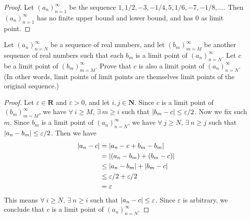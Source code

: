 \begin{proof}
Let \((a_n)_{n = 1}^\infty\) be the sequence \(1, 1/2, -3, -1/4, 5, 1/6, -7, -1/8, \dots\).
Then \((a_n)_{n = 1}^\infty\) has no finite upper bound and lower bound, and has \(0\) as limit point.
\end{proof}

\begin{exercise}\label{ex 6.4.10}
Let \((a_n)_{n = N}^\infty\) be a sequence of real numbers, and let \((b_m)_{m = M}^\infty\) be another sequence of real numbers such that each \(b_m\) is a limit point of \((a_n)_{n = N}^\infty\).
Let \(c\) be a limit point of \((b_m)_{m = M}^\infty\).
Prove that \(c\) is also a limit point of \((a_n)_{n = N}^\infty\).
(In other words, limit points of limit points are themselves limit points of the original sequence.)
\end{exercise}

\begin{proof}
Let \(\varepsilon \in \mathbf{R}\) and \(\varepsilon > 0\), and let \(i, j \in \mathbf{N}\).
Since \(c\) is a limit point of \((b_m)_{m = M}^\infty\), we have \(\forall\ i \geq M\), \(\exists\ m \geq i\) such that \(\abs*{b_m - c} \leq \varepsilon / 2\).
Now we fix such \(m\).
Since \(b_m\) is a limit point of \((a_n)_{n = N}^\infty\), we have \(\forall\ j \geq N\), \(\exists\ n \geq j\) such that \(\abs*{a_n - b_m} \leq \varepsilon / 2\).
Then we have
\begin{align*}
\abs*{a_n - c} &= \abs*{a_n - c + b_m - b_m} \\
&= \abs*{(a_n - b_m) + (b_m - c)} \\
&\leq \abs*{a_n - b_m} + \abs*{b_m - c} \\
&\leq \varepsilon / 2 + \varepsilon / 2 \\
&= \varepsilon
\end{align*}
This means \(\forall\ i \geq N\), \(\exists\ n \geq i\) such that \(\abs*{a_n - c} \leq \varepsilon\).
Since \(\varepsilon\) is arbitrary, we conclude that \(c\) is a limit point of \((a_n)_{n = N}^\infty\).
\end{proof}